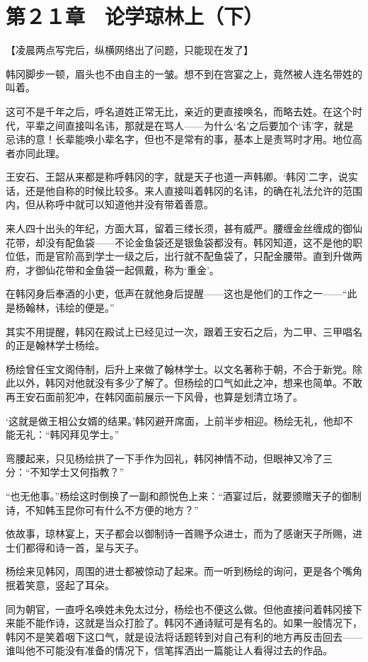 \section{第２１章　论学琼林上（下）}

【凌晨两点写完后，纵横网络出了问题，只能现在发了】

韩冈脚步一顿，眉头也不由自主的一皱。想不到在宫宴之上，竟然被人连名带姓的叫着。

这可不是千年之后，呼名道姓正常无比，亲近的更直接唤名，而略去姓。在这个时代，平辈之间直接叫名讳，那就是在骂人——为什么‘名’之后要加个‘讳’字，就是忌讳的意！长辈能唤小辈名字，但也不是常有的事，基本上是责骂时才用。地位高者亦同此理。

王安石、王韶从来都是称呼韩冈的字，就是天子也道一声韩卿。‘韩冈’二字，说实话，还是他自称的时候比较多。来人直接叫着韩冈的名讳，的确在礼法允许的范围内，但从称呼中就可以知道他并没有带着善意。

来人四十出头的年纪，方面大耳，留着三缕长须，甚有威严。腰缠金丝缠成的御仙花带，却没有配鱼袋——不论金鱼袋还是银鱼袋都没有。韩冈知道，这不是他的职位低，而是官阶高到学士一级之后，出行就不配鱼袋了，只配金腰带。直到升做两府，才御仙花带和金鱼袋一起佩戴，称为‘重金’。

在韩冈身后奉酒的小吏，低声在就他身后提醒——这也是他们的工作之一——“此是杨翰林，讳绘的便是。”

其实不用提醒，韩冈在殿试上已经见过一次，跟着王安石之后，为二甲、三甲唱名的正是翰林学士杨绘。

杨绘曾任宝文阁侍制，后升上来做了翰林学士。以文名著称于朝，不合于新党。除此以外，韩冈对他就没有多少了解了。但杨绘的口气如此之冲，想来也简单。不敢再王安石面前犯冲，在韩冈面前展示一下风骨，也算是划清立场了。

‘这就是做王相公女婿的结果。’韩冈避开席面，上前半步相迎。杨绘无礼，他却不能无礼：“韩冈拜见学士。”

弯腰起来，只见杨绘拱了一下手作为回礼，韩冈神情不动，但眼神又冷了三分：“不知学士又何指教？”

“也无他事。”杨绘这时倒换了一副和颜悦色上来：“酒宴过后，就要颁赠天子的御制诗，不知韩玉昆你可有什么不方便的地方？”

依故事，琼林宴上，天子都会以御制诗一首赐予众进士，而为了感谢天子所赐，进士们都得和诗一首，呈与天子。

杨绘来见韩冈，周围的进士都被惊动了起来。而一听到杨绘的询问，更是各个嘴角抿着笑意，竖起了耳朵。

同为朝官，一直呼名唤姓未免太过分，杨绘也不便这么做。但他直接问着韩冈接下来能不能作诗，这就是当众打脸了。韩冈不通诗赋可是有名的。如果一般情况下，韩冈不是笑着咽下这口气，就是设法将话题转到对自己有利的地方再反击回去——谁叫他不可能没有准备的情况下，信笔挥洒出一篇能让人看得过去的作品。

